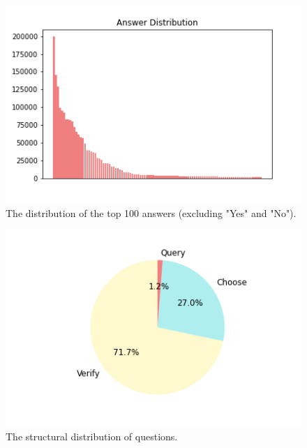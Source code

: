 \documentclass[10pt,twocolumn,letterpaper]{article}
\begin{document}
\subsection{}

\begin{figure}[t]
\begin{center}
\includegraphics[width=0.8\linewidth]{Figures/answer_dist.png}
\end{center}
   \caption{The distribution of the top 100 answers (excluding "Yes" and "No").}
\label{answer_dist}
\end{figure}


\begin{figure}[t]
\begin{center}
\includegraphics[width=0.8\linewidth]{Figures/struct_dist.png}
\caption{The structural distribution of questions.}
\end{center}
\label{structural}
\end{figure}
\end{document}
